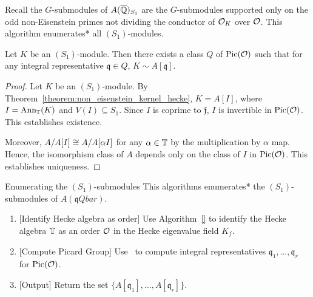 \documentclass{article}
\begin{document}
Recall the $G$-submodules of $A(\overline{\mathbb{Q}})_{S_1}$ are the $G$-submodules supported
only on the odd non-Eisenstein primes not dividing the conductor of $\mathcal{O}_K$ over
$\mathcal{O}$. This algorithm enumerates* all $(S_1)$-modules.
\begin{theorem}\label{theorem:non_eisenstein_no_conductor}
    Let $K$ be an $(S_1)$-module. Then there exists a class $Q$ of $\operatorname{Pic}(\mathcal{O})$
    such that for any integral representative $\mathfrak{q}\in Q$, $K\sim
    A[\mathfrak{q}]$.
\end{theorem}
\begin{proof}
    Let $K$ be an $(S_1)$-module. By
    Theorem~\ref{theorem:non_eisenstein_kernel_hecke}, $K=A[I]$, where
    $I=\operatorname{Ann}_{\mathbb{T}}(K)$ and $V(I)\subseteq S_1$. Since $I$ is coprime to
    $\mathfrak{f}$, $I$ is invertible in $\operatorname{Pic}(\mathcal{O})$. This establishes
    existence.
    
    Moreover, $A/A[I]\cong A/A[\alpha I]$ for any $\alpha\in \mathbb{T}$ by the
    multiplication by $\alpha$ map. Hence, the isomorphism class of $A$ depends
    only on the class of $I$ in $\operatorname{Pic}(\mathcal{O})$. This establishes uniqueness.
\end{proof}

\begin{algorithm}{Enumerating the $(S_1)$-submodules}%
    \label{alg:non_eisenstein_away_from_conductor}
    This algorithms enumerates* the $(S_1)$-submodules of $A(\mathfrak{q}Qbar)$. 
    \begin{enumerate}
        \item{} [Identify Hecke algebra as order]
            Use Algorithm~\ref{} to identify the Hecke algebra $\mathbb{T}$ as an
            order $\mathcal{O}$ in the Hecke eigenvalue field $K_f$.
        \item{} [Compute Picard Group]
            Use~\cite[\S 8]{kluners-pauli:picard} to compute integral representatives
            $\mathfrak{q}_1,\ldots,\mathfrak{q}_r$ for $\operatorname{Pic}(\mathcal{O})$.
        \item{} [Output]
            Return the set $\{A[\mathfrak{q}_1],\ldots,A[\mathfrak{q}_r]\}$.
    \end{enumerate}
\end{algorithm}



\end{document}
